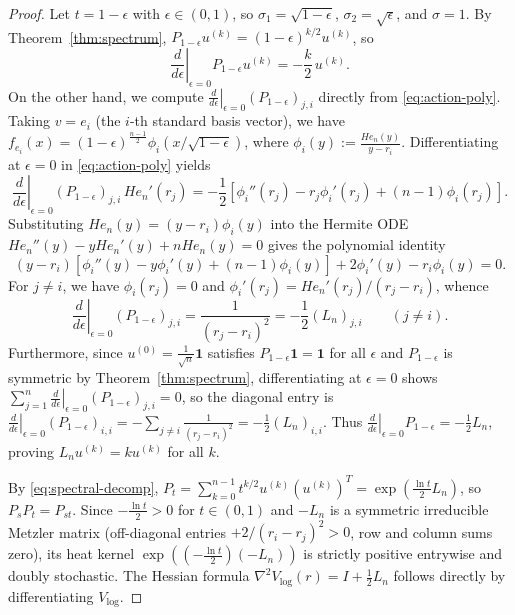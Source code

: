 \documentclass[11pt,a4paper]{article}
\theoremstyle{definition}
\newcommand{\one}{\mathbf{1}}
\begin{document}
\begin{proof}
Let $t = 1 - \epsilon$ with $\epsilon \in (0,1)$, so $\sigma_1 = \sqrt{1-\epsilon}$, $\sigma_2 = \sqrt{\epsilon}$, and $\sigma = 1$. By Theorem~\ref{thm:spectrum}, $P_{1-\epsilon} u^{(k)} = (1-\epsilon)^{k/2} u^{(k)}$, so
\[
\left.\frac{d}{d\epsilon}\right|_{\epsilon=0} P_{1-\epsilon} u^{(k)} = -\frac{k}{2}\, u^{(k)}.
\]
On the other hand, we compute $\left.\frac{d}{d\epsilon}\right|_{\epsilon=0} (P_{1-\epsilon})_{j,i}$ directly from \eqref{eq:action-poly}. Taking $v = e_i$ (the $i$-th standard basis vector), we have $f_{e_i}(x) = (1-\epsilon)^{\frac{n-1}{2}} \phi_i(x/\sqrt{1-\epsilon})$, where $\phi_i(y) := \frac{He_n(y)}{y - r_i}$. Differentiating at $\epsilon = 0$ in \eqref{eq:action-poly} yields
\[
\left.\frac{d}{d\epsilon}\right|_{\epsilon=0} (P_{1-\epsilon})_{j,i}\, He_n'(r_j) = -\frac{1}{2}\left[\phi_i''(r_j) - r_j \phi_i'(r_j) + (n-1)\phi_i(r_j)\right].
\]
Substituting $He_n(y) = (y - r_i)\phi_i(y)$ into the Hermite ODE $He_n''(y) - y He_n'(y) + n He_n(y) = 0$ gives the polynomial identity
\[
(y - r_i)\left[\phi_i''(y) - y \phi_i'(y) + (n-1)\phi_i(y)\right] + 2\phi_i'(y) - r_i \phi_i(y) = 0.
\]
For $j \neq i$, we have $\phi_i(r_j) = 0$ and $\phi_i'(r_j) = He_n'(r_j)/(r_j - r_i)$, whence
\[
\left.\frac{d}{d\epsilon}\right|_{\epsilon=0} (P_{1-\epsilon})_{j,i} = \frac{1}{(r_j - r_i)^2} = -\frac{1}{2}(L_n)_{j,i} \qquad (j \neq i).
\]
Furthermore, since $u^{(0)} = \frac{1}{\sqrt{n}}\one$ satisfies $P_{1-\epsilon}\one = \one$ for all $\epsilon$ and $P_{1-\epsilon}$ is symmetric by Theorem~\ref{thm:spectrum}, differentiating at $\epsilon = 0$ shows $\sum_{j=1}^n \left.\frac{d}{d\epsilon}\right|_{\epsilon=0}(P_{1-\epsilon})_{j,i} = 0$, so the diagonal entry is $\left.\frac{d}{d\epsilon}\right|_{\epsilon=0}(P_{1-\epsilon})_{i,i} = -\sum_{j \neq i}\frac{1}{(r_j - r_i)^2} = -\frac{1}{2}(L_n)_{i,i}$. Thus $\left.\frac{d}{d\epsilon}\right|_{\epsilon=0} P_{1-\epsilon} = -\frac{1}{2}L_n$, proving $L_n u^{(k)} = k u^{(k)}$ for all $k$.

By \eqref{eq:spectral-decomp}, $P_t = \sum_{k=0}^{n-1} t^{k/2} u^{(k)}(u^{(k)})^T = \exp(\frac{\ln t}{2} L_n)$, so $P_s P_t = P_{st}$. Since $-\frac{\ln t}{2} > 0$ for $t \in (0,1)$ and $-L_n$ is a symmetric irreducible Metzler matrix (off-diagonal entries $+2/(r_i-r_j)^2 > 0$, row and column sums zero), its heat kernel $\exp((-\frac{\ln t}{2})(-L_n))$ is strictly positive entrywise and doubly stochastic. The Hessian formula $\nabla^2 V_{\log}(r) = I + \frac{1}{2}L_n$ follows directly by differentiating $V_{\log}$.
\end{proof}
\end{document}
